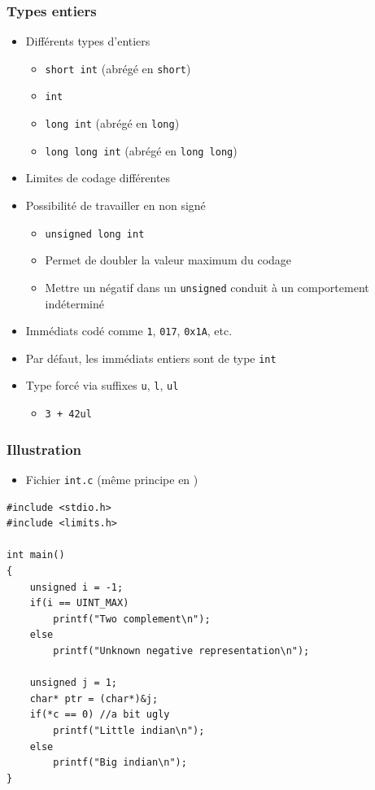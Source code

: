 \begin{frame}
\frametitle{Types entiers}
\begin{itemize}[<+->]
\item Différents types d'entiers
	\begin{itemize}
	\item \lstinline|short int| (abrégé en \lstinline|short|)
	\item \lstinline|int|
	\item \lstinline|long int| (abrégé en \lstinline|long|)
	\item \lstinline|long long int| (abrégé en \lstinline|long long|)
	\end{itemize}
\item Limites de codage différentes
\item Possibilité de travailler en non signé
	\begin{itemize}
	\item \lstinline|unsigned long int|
	\item Permet de doubler la valeur maximum du codage
	\item Mettre un négatif dans un \lstinline|unsigned| conduit à un comportement indéterminé
	\end{itemize}
\item Immédiats codé comme \texttt{1}, \texttt{017}, \texttt{0x1A}, etc.
\item Par défaut, les immédiats entiers sont de type \lstinline|int|
\item Type forcé via suffixes \texttt{u}, \texttt{l}, \texttt{ul}
	\begin{itemize}
	\item \texttt{3 + 42ul}
	\end{itemize}
\end{itemize}
\end{frame}

\begin{frame}[containsverbatim]
\frametitle{Illustration}
\begin{itemize}
\item Fichier \texttt{int.c} (même principe en \cpp)
\end{itemize}
\begin{lstlisting}
#include <stdio.h>
#include <limits.h>

int main()
{
	unsigned i = -1;
	if(i == UINT_MAX)
		printf("Two complement\n");
	else
		printf("Unknown negative representation\n");
		
	unsigned j = 1;
	char* ptr = (char*)&j;
	if(*c == 0) //a bit ugly
		printf("Little indian\n");
	else
		printf("Big indian\n");
}
\end{lstlisting}
\end{frame}

